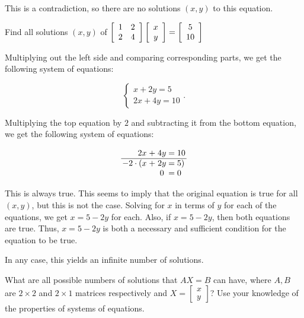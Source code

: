 \documentclass[../key.tex]{subfiles}
\begin{document}
This is a contradiction, so there are no solutions $(x,y)$ to this equation.

\begin{inner_problem}
\item Find all solutions $(x,y)$ of $\left[\begin{array}{cc} 1 & 2 \\ 2 & 4 \end{array}\right]\left[\begin{array}{c} x \\ y \end{array}\right]=\left[\begin{array}{c} 5 \\ 10 \end{array}\right]$
\end{inner_problem}

Multiplying out the left side and comparing corresponding parts, we get the following system of equations:

$$\begin{cases} x + 2y = 5 \\ 2x + 4y = 10 \end{cases}.$$

Multiplying the top equation by $2$ and subtracting it from the bottom equation, we get the following system of equations:

$$\arraycolsep=1.4pt\begin{array}{rcccl}
2x & + & 4y & = & 10 \\ \hline
-2\cdot ( x & + & 2y & = & 5) \\
& & 0 & = & 0 \\
\end{array}$$

This is always true. This seems to imply that the original equation is true for all $(x,y)$, but this is not the case. Solving for $x$ in terms of $y$ for each of the equations, we get $x=5-2y$ for each. Also, if $x=5-2y$, then both equations are true. Thus, $x=5-2y$ is both a necessary and sufficient condition for the equation to be true.

In any case, this yields an infinite number of solutions.

\begin{inner_problem}
\item What are all possible numbers of solutions that $AX=B$ can have, where $A,B$ are $2\times 2$ and $2\times 1$ matrices respectively and $X=\left[\begin{smallmatrix} x \\ y \end{smallmatrix}\right]$? Use your knowledge of the properties of systems of equations.
\end{inner_problem}
\end{document}
